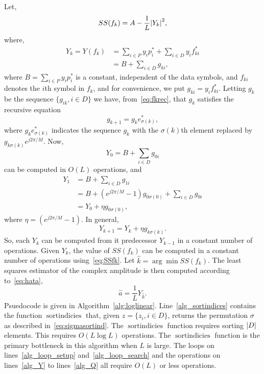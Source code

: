 \documentclass[journal]{IEEEtran}
\begin{document}
Let,
\begin{equation}\label{eq:SSfk}
SS(f_k) = A - \frac{1}{L}{\left\vert Y_k \right\vert}^2,
\end{equation}
where, 
\begin{align*}
Y_k = Y( f_k ) &= \sum_{i \in P} y_i p_i^*  + \sum_{i \in D} y_i f_{ki}^* \\
&= B + \sum_{i \in D}g_{ki},
\end{align*}
where $B = \sum_{i \in P} y_i p_i^*$ is a constant, independent of the data symbols, and $f_{ki}$ denotes the $i$th symbol in $f_k$, and for convenience, we put $g_{ki}  = y_i f_{ki}^*$.  Letting $g_{k}$ be the sequence $\{g_{ik}, i \in D\}$ we have, from~\eqref{eq:fkrec}, that $g_k$ satisfies the recursive equation
\[
g_{k+1} = g_{k} e_{\sigma(k)}^*,
\]
where $g_{k} e_{\sigma(k)}^*$ indicates the sequence $g_k$ with the $\sigma(k)$th element replaced by $g_{k \sigma(k)}e^{j2\pi/M}$.  Now,
\[
Y_0 = B + \sum_{i \in D} g_{0i}
\] 
can be computed in $O(L)$ operations, and
\begin{align*}
Y_1 &= B + \sum_{i \in D} g_{1i} \\
&= B +  (e^{j2\pi/M} - 1)g_{0\sigma(0)} + \sum_{i \in D} g_{0i} \\
&= Y_0 + \eta g_{0\sigma(0)},
\end{align*}
where $\eta = (e^{j2\pi/M} - 1)$.  In general,
\[
Y_{k+1} = Y_k + \eta g_{k\sigma(k)}.
\]
So, each $Y_k$ can be computed from it predecessor $Y_{k-1}$ in a constant number of operations.  Given $Y_k$, the value of $SS(f_k)$ can be computed in a constant number of operations using~\eqref{eq:SSfk}.  Let $\hat{k} = \arg\min SS(f_k)$.  The least squares estimator of the complex amplitude is then computed according to~\eqref{eq:hata},
\begin{equation}\label{eq:ahatYhat}
\hat{a} = \frac{1}{L} Y_{\hat{k}}.
\end{equation}
Psuedocode is given in Algorithm~\ref{alg:loglinear}.  Line~\ref{alg_sortindices} contains the function $\operatorname{sortindicies}$ that, given $z = \{z_i, i \in D\}$, returns the permutation $\sigma$ as described in~\eqref{eq:sigmasortind}.  The $\operatorname{sortindicies}$ function requires sorting ${\left\vert D \right\vert}$ elements.  This requires $O(L \log L)$ operations.  The $\operatorname{sortindicies}$ function is the primary bottleneck in this algorithm when $L$ is large.  The loops on lines~\ref{alg_loop_setup} and~\ref{alg_loop_search} and the operations on lines~\ref{alg_Y} to lines~\ref{alg_Q} all require $O(L)$ or less operations.  %
\end{document}
